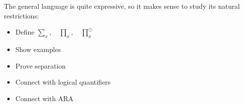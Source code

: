 The general language is quite expressive, so it makes sense to study its natural restrictions:
\begin{itemize}
\item Define $\sum_x, \quad \prod_x, \quad \prod_x^{\odot}$
\item Show examples
\item Prove separation
\item Connect with logical quantifiers
\item Connect with ARA
\end{itemize}